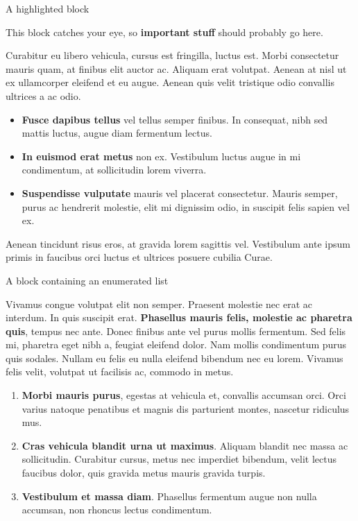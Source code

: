 \documentclass[final]{beamer}
\newlength{\colwidth}
\begin{document}
\begin{frame}[t]
\begin{columns}[t]
\begin{column}{\colwidth}
			\begin{alertblock}{A highlighted block}

				This block catches your eye, so \textbf{important stuff} should probably go
				here.

				Curabitur eu libero vehicula, cursus est fringilla, luctus est. Morbi
				consectetur mauris quam, at finibus elit auctor ac. Aliquam erat volutpat.
				Aenean at nisl ut ex ullamcorper eleifend et eu augue. Aenean quis velit
				tristique odio convallis ultrices a ac odio.

				\begin{itemize}
					\item \textbf{Fusce dapibus tellus} vel tellus semper finibus. In
					      consequat, nibh sed mattis luctus, augue diam fermentum lectus.
					\item \textbf{In euismod erat metus} non ex. Vestibulum luctus augue in
					      mi condimentum, at sollicitudin lorem viverra.
					\item \textbf{Suspendisse vulputate} mauris vel placerat consectetur.
					      Mauris semper, purus ac hendrerit molestie, elit mi dignissim odio, in
					      suscipit felis sapien vel ex.
				\end{itemize}

				Aenean tincidunt risus eros, at gravida lorem sagittis vel. Vestibulum ante
				ipsum primis in faucibus orci luctus et ultrices posuere cubilia Curae.

			\end{alertblock}

			\begin{block}{A block containing an enumerated list}

				Vivamus congue volutpat elit non semper. Praesent molestie nec erat ac
				interdum. In quis suscipit erat. \textbf{Phasellus mauris felis, molestie
					ac pharetra quis}, tempus nec ante. Donec finibus ante vel purus mollis
				fermentum. Sed felis mi, pharetra eget nibh a, feugiat eleifend dolor. Nam
				mollis condimentum purus quis sodales. Nullam eu felis eu nulla eleifend
				bibendum nec eu lorem. Vivamus felis velit, volutpat ut facilisis ac,
				commodo in metus.

				\begin{enumerate}
					\item \textbf{Morbi mauris purus}, egestas at vehicula et, convallis
					      accumsan orci. Orci varius natoque penatibus et magnis dis parturient
					      montes, nascetur ridiculus mus.
					\item \textbf{Cras vehicula blandit urna ut maximus}. Aliquam blandit nec
					      massa ac sollicitudin. Curabitur cursus, metus nec imperdiet bibendum,
					      velit lectus faucibus dolor, quis gravida metus mauris gravida turpis.
					\item \textbf{Vestibulum et massa diam}. Phasellus fermentum augue non
					      nulla accumsan, non rhoncus lectus condimentum.
				\end{enumerate}


\end{block}
\end{column}
\end{columns}
\end{frame}
\end{document}
